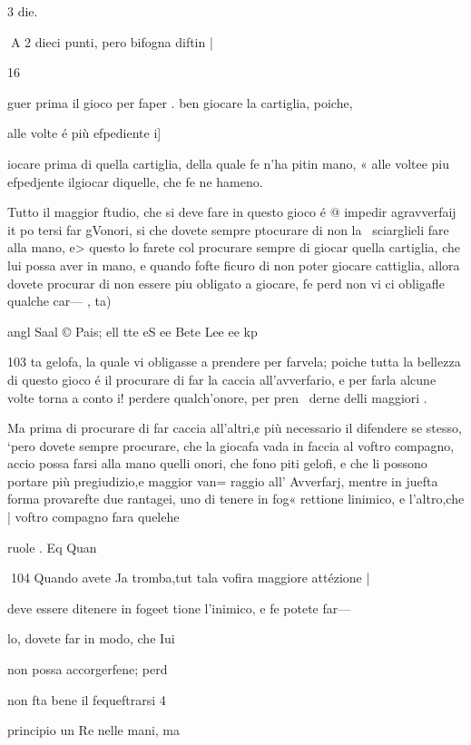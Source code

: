 \documentclass[12pt,a6paper]{article}
\begin{document}
3 die.

 

 

 
A 2
dieci punti, pero bifogna diftin |

16

guer prima il gioco per faper .
ben giocare la cartiglia, poiche,

alle volte é più efpediente i]

iocare prima di quella cartiglia, della quale fe n’ha pitin
mano, « alle voltee piu efpedjente ilgiocar diquelle, che
fe ne hameno.

Tutto il maggior ftudio, che
si deve fare in questo gioco é
@ impedir agravverfaij it po
tersi far gVonori, si che dovete
sempre ptocurare di non la~
sciarglieli fare alla mano, e>
questo lo farete col procurare
sempre di giocar quella cartiglia, che lui possa aver in mano, e quando fofte ficuro di non
poter giocare cattiglia, allora
dovete procurar di non essere
piu obligato a giocare, fe perd
non vi ci obligafle qualche car—
, ta)

 

angl Saal © Pais; ell tte eS ee Bete Lee ee kp

 
 

103
ta gelofa, la quale vi obligasse
a prendere per farvela; poiche
tutta la bellezza di questo gioco
é il procurare di far la caccia
all’avverfario, e per farla alcune volte torna a conto i! perdere qualch’onore, per pren~
derne delli maggiori .

Ma prima di procurare di far
caccia all’altri,¢ più necessario il
difendere se stesso, ‘pero dovete
sempre procurare, che la giocafa vada in faccia al voftro compagno, accio possa farsi alla mano quelli onori, che fono piti gelofi, e che li possono portare
più pregiudizio,e maggior van=
raggio all’ Avverfarj, mentre in
juefta forma provarefte due
rantagei, uno di tenere in fog«
rettione linimico, e l’altro,che
| voftro compagno fara quelehe

ruole .
Eq Quan
 
104
Quando avete Ja tromba,tut
tala vofira maggiore attézione |

deve essere ditenere in fogeet
tione l’inimico, e fe potete far—

lo, dovete far in modo, che Iui

non possa accorgerfene; perd 

non fta bene il fequeftrarsi 4

principio un Re nelle mani, ma
\end{document}
